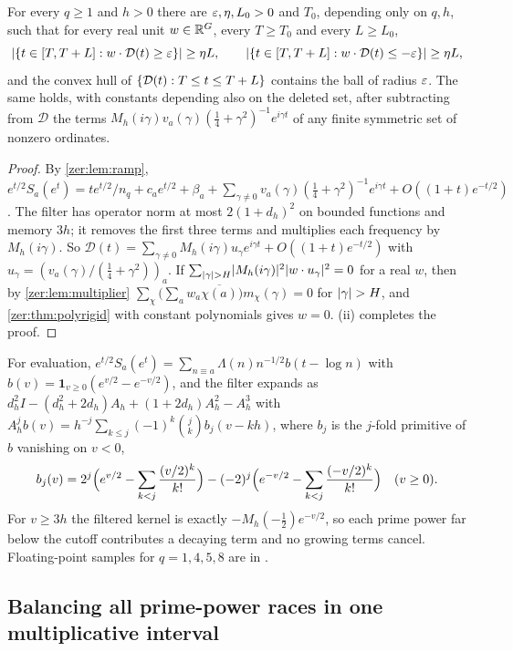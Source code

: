 \begin{theorem}\label{zer:thm:filtered}
For every $q\ge1$ and $h>0$ there are $\varepsilon,\eta,L_0>0$ and $T_0$, depending only on $q,h$, such
that for every real unit $w\in\mathbb{R}^G$, every $T\ge T_0$ and every $L\ge L_0$,
\[
 \lvert\{t\in[T,T+L]:w\cdot\mathcal D(t)\ge\varepsilon\}\rvert\ge\eta L,\qquad
 \lvert\{t\in[T,T+L]:w\cdot\mathcal D(t)\le-\varepsilon\}\rvert\ge\eta L,
\]
and the convex hull of $\{\mathcal D(t):T\le t\le T+L\}$ contains the ball of radius $\varepsilon$. The
same holds, with constants depending also on the deleted set, after subtracting from $\mathcal D$
the terms $M_h(i\gamma)v_a(\gamma)(\tfrac14+\gamma^2)^{-1}e^{i\gamma t}$ of any finite symmetric set of
nonzero ordinates.
\end{theorem}
\begin{proof}
By \cref{zer:lem:ramp},
$e^{t/2}S_a(e^t)=te^{t/2}/n_q+c_ae^{t/2}+\beta_a+\sum_{\gamma\ne0}v_a(\gamma)(\tfrac14+\gamma^2)^{-1}e^{i\gamma t}+O((1+t)e^{-t/2})$.
The filter has operator norm at most $2(1+d_h)^2$ on bounded functions and memory $3h$; it
removes the first three terms and multiplies each frequency by $M_h(i\gamma)$. So
$\mathcal D(t)=\sum_{\gamma\ne0}M_h(i\gamma)u_\gamma e^{i\gamma t}+O((1+t)e^{-t/2})$ with
$u_\gamma=(v_a(\gamma)/(\tfrac14+\gamma^2))_a$. If
$\sum_{\lvert\gamma\rvert>H}\lvert M_h(i\gamma)\rvert^2\lvert w\cdot u_\gamma\rvert^2=0$ for a real $w$, then by
\cref{zer:lem:multiplier}
$\sum_\chi\bigl(\sum_aw_a\overline{\chi(a)}\bigr)m_\chi(\gamma)=0$ for $\lvert\gamma\rvert>H$, and
\cref{zer:thm:polyrigid} with constant polynomials gives $w=0$. (ii) completes
the proof.
\end{proof}

For evaluation, $e^{t/2}S_a(e^t)=\sum_{n\equiv a}\Lambda(n)n^{-1/2}b(t-\log n)$ with
$b(v)=\mathbf 1_{v\ge0}(e^{v/2}-e^{-v/2})$, and the filter expands as
$d_h^2I-(d_h^2+2d_h)A_h+(1+2d_h)A_h^2-A_h^3$ with
$A_h^jb(v)=h^{-j}\sum_{k\le j}(-1)^k\binom jkb_j(v-kh)$, where $b_j$ is the $j$-fold primitive
of $b$ vanishing on $v<0$,
\[
 b_j(v)=2^j\Bigl(e^{v/2}-\sum_{k<j}\frac{(v/2)^k}{k!}\Bigr)
 -(-2)^j\Bigl(e^{-v/2}-\sum_{k<j}\frac{(-v/2)^k}{k!}\Bigr)\quad(v\ge0).
\]
For $v\ge3h$ the filtered kernel is exactly $-M_h(-\tfrac12)e^{-v/2}$, so each prime power far
below the cutoff contributes a decaying term and no growing terms cancel. Floating-point
samples for $q=1,4,5,8$ are in .





\subsection{Balancing all prime-power races in one multiplicative interval}\label{zer:sec:balancing}

